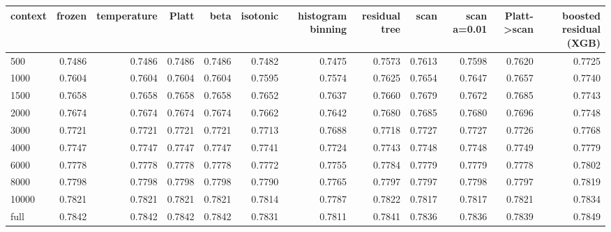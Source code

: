 \begin{tabular}{lrrrrrrrrrrr}
\toprule
context & frozen & temperature & Platt & beta & isotonic & histogram binning & residual tree & scan & scan a=0.01 & Platt->scan & boosted residual (XGB) \\
\midrule
500 & 0.7486 & 0.7486 & 0.7486 & 0.7486 & 0.7482 & 0.7475 & 0.7573 & 0.7613 & 0.7598 & 0.7620 & 0.7725 \\
1000 & 0.7604 & 0.7604 & 0.7604 & 0.7604 & 0.7595 & 0.7574 & 0.7625 & 0.7654 & 0.7647 & 0.7657 & 0.7740 \\
1500 & 0.7658 & 0.7658 & 0.7658 & 0.7658 & 0.7652 & 0.7637 & 0.7660 & 0.7679 & 0.7672 & 0.7685 & 0.7743 \\
2000 & 0.7674 & 0.7674 & 0.7674 & 0.7674 & 0.7662 & 0.7642 & 0.7680 & 0.7685 & 0.7680 & 0.7696 & 0.7748 \\
3000 & 0.7721 & 0.7721 & 0.7721 & 0.7721 & 0.7713 & 0.7688 & 0.7718 & 0.7727 & 0.7727 & 0.7726 & 0.7768 \\
4000 & 0.7747 & 0.7747 & 0.7747 & 0.7747 & 0.7741 & 0.7724 & 0.7743 & 0.7748 & 0.7748 & 0.7749 & 0.7779 \\
6000 & 0.7778 & 0.7778 & 0.7778 & 0.7778 & 0.7772 & 0.7755 & 0.7784 & 0.7779 & 0.7779 & 0.7778 & 0.7802 \\
8000 & 0.7798 & 0.7798 & 0.7798 & 0.7798 & 0.7790 & 0.7765 & 0.7797 & 0.7797 & 0.7798 & 0.7797 & 0.7819 \\
10000 & 0.7821 & 0.7821 & 0.7821 & 0.7821 & 0.7814 & 0.7787 & 0.7822 & 0.7817 & 0.7817 & 0.7821 & 0.7834 \\
full & 0.7842 & 0.7842 & 0.7842 & 0.7842 & 0.7831 & 0.7811 & 0.7841 & 0.7836 & 0.7836 & 0.7839 & 0.7849 \\
\bottomrule
\end{tabular}
